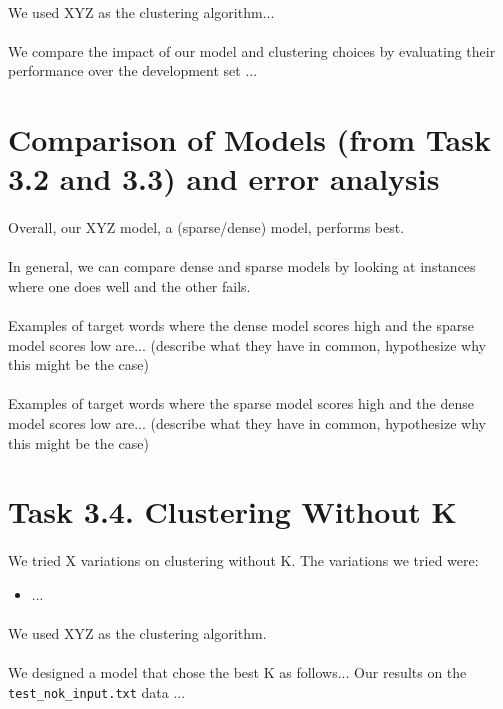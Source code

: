 \documentclass{article}
\begin{document}
\paragraph{}
We used XYZ as the clustering algorithm...

\paragraph{}
We compare the impact of our model and clustering choices by evaluating their performance over the development set ...


\newpage
\section*{Comparison of Models (from Task 3.2 and 3.3) and error analysis}

\paragraph{}
Overall, our XYZ model, a (sparse/dense) model, performs best.

\paragraph{}
In general, we can compare dense and sparse models by looking at instances where one does well and the other fails.

\paragraph{}
Examples of target words where the dense model scores high and the sparse model scores low are... (describe what they have in common, hypothesize why this might be the case)

\paragraph{}
Examples of target words where the sparse model scores high and the dense model scores low are... (describe what they have in common, hypothesize why this might be the case)


\newpage
\section*{Task 3.4. Clustering Without K}

\paragraph{}
We tried X variations on clustering without K. The variations we tried were:

\begin{itemize}
	\item ...
\end{itemize}

\paragraph{}
We used XYZ as the clustering algorithm.

\paragraph{}
We designed a model that chose the best K as follows... Our results on the \texttt{test\_nok\_input.txt} data ...
\end{document}
